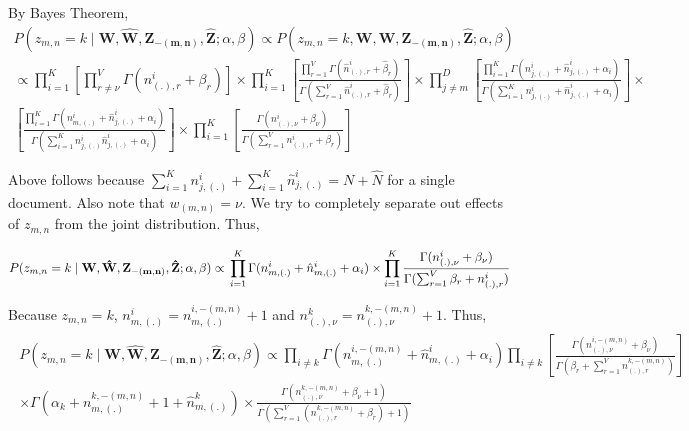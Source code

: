 \documentclass[a4paper]{article}
\begin{document}
By Bayes Theorem, 
\begin{multline*}
P(z_{m,n} = k \mid \mathbf{W}, \mathbf{\hat{W}}, \mathbf{Z_{-(m,n)}}, \mathbf{\hat{Z}} ; \alpha, \beta ) \propto   P(z_{m,n} = k, \mathbf{W}, \mathbf{\hat{W}}, \mathbf{Z_{-(m,n)}}, \mathbf{\hat{Z}} ; \alpha, \beta  )\\ 
\propto 
\prod_{i = 1}^{K} \left[ \prod_{r \neq \nu}^{V} \Gamma(n_{(.),r}^{i} + \beta_{r} )\right] \times
\prod_{i=1}^{K} \left[ \frac{\prod_{r=1}^{V} \Gamma(\hat{n}_{(.),r}^{i} + \hat{\beta}_{r} )}{\Gamma(\sum_{r=1}^{V}\hat{n}_{(.),r}^{i} + \hat{\beta}_{r} )}  \right] \times
\prod_{j \neq m}^{D}\left[  \frac{\prod_{i=1}^{K} \Gamma(n_{j,(.)}^{i} + \hat{n}_{j,(.)}^{i} +  \alpha_{i} )}{\Gamma(\sum_{i=1}^{K}n_{j,(.)}^{i} + \hat{n}_{j,(.)}^{i} +  \alpha_{i} )} \right] \times \\
 \left[ \frac{\prod_{i=1}^{K} \Gamma(n_{m,(.)}^{i} + \hat{n}_{j,(.)}^{i} +\alpha_{i})}{\Gamma(\sum_{i=1}^{K} n_{j,(.)}^{i} \hat{n}_{j,(.)}^{i} + \alpha_{i})} \right] \times
 \prod_{i=1}^{K} \left[ \frac{\Gamma(n_{(.),\nu}^{i} + \beta_{\nu})}{\Gamma(\sum_{r=1}^{V} n_{(.),r}^{i} + \beta_{r})} \right]
\end{multline*}

Above follows because  $\sum_{i=1}^{K} n_{j,(.)}^{i} + \sum_{i=1}^{K} \hat{n}_{j,(.)}^{i} = N + \hat{N}$  for a single document. Also note that $w_{(m,n)} = \nu$. We try to completely separate out effects of $z_{m,n}$ from the joint distribution. Thus, 

\begin{displaymath}
P(z_{m,n} = k \mid \mathbf{W}, \mathbf{\hat{W}}, \mathbf{Z_{-(m,n)}}, \mathbf{\hat{Z}} ; \alpha, \beta ) 
 \propto \\ \prod_{i=1}^{K} \Gamma(n_{m,(.)}^{i} + \hat{n}_{m,(.)}^{i} + \alpha_{i} ) \times \prod_{i=1}^{K} \frac{\Gamma(n_{(.),\nu}^{i} + \beta_{\nu} )}{\Gamma(\sum_{r=1}^{V} \beta_{r} + n_{(.),r}^{i})}
 \end{displaymath}
 
 Because $z_{m,n} = k$, $n_{m,(.)}^{i} = n_{m,(.)}^{i,-(m,n)} + 1$ and $n_{(.),\nu}^{k} = n_{(.),\nu}^{k,-(m,n)}+1$. Thus, 
 \begin{align*}
 \begin{split}
 P(z_{m,n} = k \mid \mathbf{W}, \mathbf{\hat{W}}, \mathbf{Z_{-(m,n)}}, \mathbf{\hat{Z}} ; \alpha, \beta ) 
 \propto \prod_{i \neq k} \Gamma(n_{m,(.)}^{i,-(m,n)} + \hat{n}_{m,(.)}^{i} + \alpha_{i}  ) \prod_{i \neq k} \left[ \frac{\Gamma(n_{(.),\nu}^{i,-(m,n)} + \beta_{\nu})} {\Gamma(\beta_{r} + \sum_{r=1}^{V} n_{(.),r}^{k, -(m,n)} )} \right] \\
 \times \Gamma(\alpha_{k} + n_{m,(.)}^{k,-(m,n)}  + 1 + \hat{n}_{m,(.)}^{k}) \times \frac{\Gamma(n_{(.),\nu}^{k, -(m,n)} + \beta_{\nu} + 1)}{\Gamma(\sum_{r=1}^{V} (n_{(.),r}^{k,-(m,n)} + \beta_{r} )  + 1)}
\end{split}
 \end{align*}
 
\end{document}
